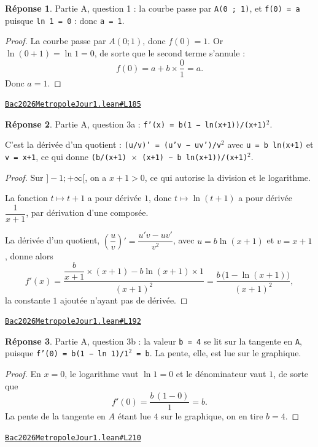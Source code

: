 \documentclass[11pt,a4paper]{article}
\theoremstyle{definition}
\theoremstyle{plain}
\theoremstyle{definition}
\newtheorem*{reponse}{Réponse}
\newcommand{\source}[2]{\par\smallskip\noindent\hfill{\footnotesize\href{#1}{\texttt{#2}}}\par\smallskip}
\begin{document}
\begin{reponse}
Partie A, question 1 : la courbe passe par \texttt{A(0 ; 1)}, et \texttt{f(0) = a} puisque
\texttt{ln 1 = 0} : donc \texttt{a = 1}.
\end{reponse}
\begin{proof}
La courbe passe par $A(0 ; 1)$, donc $f(0) = 1$. Or $\ln(0 + 1) = \ln 1 = 0$, de sorte que
le second terme s'annule :
\[ f(0) = a + b \times \frac{0}{1} = a . \]
Donc $a = 1$.
\end{proof}
\source{https://github.com/Commutator-IO/learn-lean/blob/main/exams/2026/Bac2026MetropoleJour1.lean\#L185}{Bac2026MetropoleJour1.lean\#L185}

\begin{reponse}
Partie A, question 3a : \texttt{f'(x) = b(1 − ln(x+1))/(x+1)\(^{2}\)}.

C'est la dérivée d'un quotient : \texttt{(u/v)' = (u'v − uv')/v\(^{2}\)} avec \texttt{u = b ln(x+1)} et
\texttt{v = x+1}, ce qui donne \texttt{(b/(x+1) \(\times\) (x+1) − b ln(x+1))/(x+1)\(^{2}\)}.
\end{reponse}
\begin{proof}
Sur $]-1 ; +\infty[$, on a $x + 1 > 0$, ce qui autorise la division et le logarithme.

La fonction $t \mapsto t + 1$ a pour dérivée $1$, donc $t \mapsto \ln(t+1)$ a pour dérivée
$\dfrac{1}{x+1}$, par dérivation d'une composée.

La dérivée d'un quotient, $\left(\dfrac{u}{v}\right)' = \dfrac{u'v - uv'}{v^2}$, avec
$u = b\ln(x+1)$ et $v = x+1$, donne alors
\[ f'(x) = \frac{\dfrac{b}{x+1} \times (x+1) - b\ln(x+1) \times 1}{(x+1)^2}
   = \frac{b\,\bigl(1 - \ln(x+1)\bigr)}{(x+1)^2} , \]
la constante $1$ ajoutée n'ayant pas de dérivée.
\end{proof}
\source{https://github.com/Commutator-IO/learn-lean/blob/main/exams/2026/Bac2026MetropoleJour1.lean\#L192}{Bac2026MetropoleJour1.lean\#L192}

\begin{reponse}
Partie A, question 3b : la valeur \texttt{b = 4} se lit sur la tangente en \texttt{A}, puisque
\texttt{f'(0) = b(1 − ln 1)/1\(^{2}\) = b}. La pente, elle, est lue sur le graphique.
\end{reponse}
\begin{proof}
En $x = 0$, le logarithme vaut $\ln 1 = 0$ et le dénominateur vaut $1$, de sorte que
\[ f'(0) = \frac{b\,(1 - 0)}{1} = b . \]
La pente de la tangente en $A$ étant lue $4$ sur le graphique, on en tire $b = 4$.
\end{proof}
\source{https://github.com/Commutator-IO/learn-lean/blob/main/exams/2026/Bac2026MetropoleJour1.lean\#L210}{Bac2026MetropoleJour1.lean\#L210}
\end{document}
